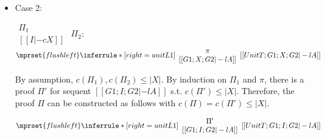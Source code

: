 \begin{itemize}
\item Case 2:
      \begin{center}
        \scriptsize
        \begin{math}
          \begin{array}{c}
            \Pi_1 \\
            {[[I |-c X]]}
          \end{array}
        \end{math}
        \qquad\qquad
        $\Pi_2$:
        \begin{math}
          $$\mprset{flushleft}
          \inferrule* [right={\tiny unitL1}] {
            {
              \begin{array}{c}
                \pi \\
                {[[G1; X; G2 |-l A]]}
              \end{array}
            }
          }{[[UnitT; G1; X; G2 |-l A]]}
        \end{math}
      \end{center}
      By assumption, $c(\Pi_1),c(\Pi_2)\leq |X|$. By induction on $\Pi_1$
      and $\pi$, there is a proof $\Pi'$ for sequent $[[G1; I; G2 |-l A]]$
      s.t. $c(\Pi') \leq |X|$. Therefore, the proof $\Pi$ can be
      constructed as follows with $c(\Pi) = c(\Pi') \leq |X|$.
      \begin{center}
        \scriptsize
        \begin{math}
          $$\mprset{flushleft}
          \inferrule* [right={\tiny unitL1}] {
            {
              \begin{array}{c}
                \Pi' \\
                {[[G1; I; G2 |-l A]]}
              \end{array}
            }
          }{[[UnitT; G1; I; G2 |-l A]]}
        \end{math}
      \end{center}


\end{itemize}

